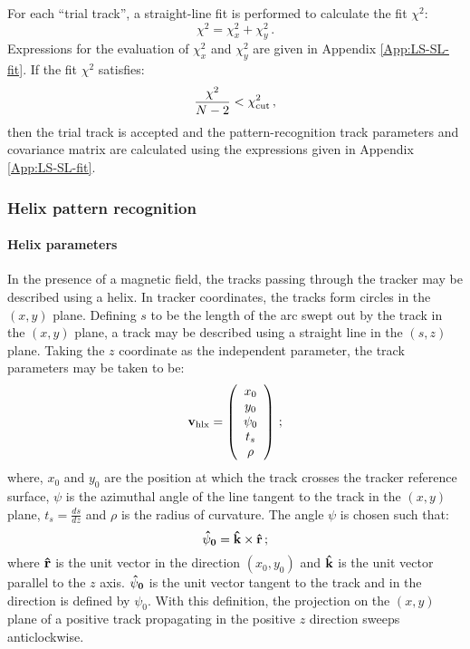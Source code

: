 For each ``trial track'', a straight-line fit is performed to
calculate the fit $\chi^2$:
\begin{equation}
  \chi^2 = \chi_x^2 + \chi_y^2 \,.
\end{equation}
Expressions for the evaluation of $\chi^2_x$ and $\chi^2_y$ are given
in Appendix \ref{App:LS-SL-fit}.
If the fit $\chi^2$ satisfies:
\begin{equation}
  \frac{\chi^2}{N-2} < \chi^2_{\rm cut} \,,
\end{equation}
then the trial track is accepted and the pattern-recognition track
parameters and covariance matrix are calculated using the expressions
given in Appendix \ref{App:LS-SL-fit}.

\subsubsection{Helix pattern recognition}
\label{SubSect:SLPatRec}

\paragraph{Helix parameters}

In the presence of a magnetic field, the tracks passing through the
tracker may be described using a helix.
In tracker coordinates, the tracks form circles in the $(x, y)$
plane.
Defining $s$ to be the length of the arc swept out by the track in the
$(x, y)$ plane, a track may be described using a straight line in the
$(s, z)$ plane.
Taking the $z$ coordinate as the independent parameter, the track
parameters may be taken to be:
\begin{equation}
 {\bf v_{\rm hlx}} =
 \left( 
   \begin{array}{c}
     x_0    \\
     y_0    \\
     \psi_0 \\
     t_s    \\
     \rho
   \end{array}
 \right)\,;
\end{equation}
where, $x_0$ and $y_0$ are the position at which the track crosses the
tracker reference surface, $\psi$ is the azimuthal angle of the line
tangent to the track in the $(x, y)$ plane, $t_s = \frac{ds}{dz}$ and 
$\rho$ is the radius of curvature. 
The angle $\psi$ is chosen such that:
\begin{equation}
  {\bf \hat{\psi}_0} = {\bf \hat{k}} \times {\bf \hat{r}} \, ;
\end{equation}
where ${\bf \hat{r}}$ is the unit vector in the direction $(x_0, y_0)$
and ${\bf \hat{k}}$ is the unit vector parallel to the $z$ axis.
${\bf \hat{\psi}_0}$ is the unit vector tangent to the track and in
the direction is defined by $\psi_0$.
With this definition, the projection on the $(x, y)$ plane of a
positive track propagating in the positive $z$ direction sweeps
anticlockwise.

